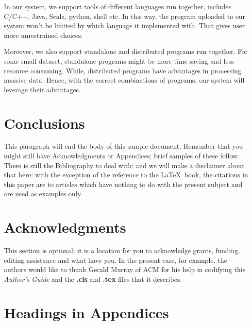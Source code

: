 \documentclass{sig-alternate-05-2015}
\begin{document}
In our system, we support tools of different languages run together, includes C/C++, Java, Scala, python, shell etc. In this way, the program uploaded to our system won't be limited by which language it implemented with. That gives user more unrestrained choices.

Moreover, we also support standalone and distributed programs run together. For some small dataset, standalone programs might be more time saving and less resource consuming. While, distributed programs have advantages in processing massive data. Hence, with the correct combinations of programs, our system will leverage their advantages.

\section{Conclusions}
This paragraph will end the body of this sample document.
Remember that you might still have Acknowledgments or
Appendices; brief samples of these
follow.  There is still the Bibliography to deal with; and
we will make a disclaimer about that here: with the exception
of the reference to the \LaTeX\ book, the citations in
this paper are to articles which have nothing to
do with the present subject and are used as
examples only.

\section{Acknowledgments}
This section is optional; it is a location for you
to acknowledge grants, funding, editing assistance and
what have you.  In the present case, for example, the
authors would like to thank Gerald Murray of ACM for
his help in codifying this \textit{Author's Guide}
and the \textbf{.cls} and \textbf{.tex} files that it describes.

\appendix
\section{Headings in Appendices}
\end{document}
